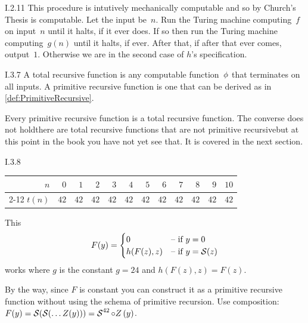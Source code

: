 %
\begin{ans}{I.2.11}
This procedure is intutively mechanically computable
and so by Church's Thesis is computable.
Let the input be~$n$.
Run the Turing machine computing~$f$ on input~$n$ until it halts,
if it ever does.
If so then run the Turing machine computing~$g(n)$ until it halts,
if ever.
After that, if after that ever comes, output~$1$.
Otherwise we are in the second case of $h$'s specification.
\end{ans}
%
%
%
%
%
%
\begin{ans}{I.3.7}
A total recursive function is any computable function~$\phi$ that terminates
on all inputs.
A primitive recursive function is one that can be derived as in
\cref{def:PrimitiveRecursive}.

Every primitive recursive function is a total recursive function.
The converse does not hold\Dash there are total recursive functions that
are not primitive recursive\Dash but at this point in the book you have
not yet see that.
It is covered in the next section.
\end{ans}
%
\begin{ans}{I.3.8}
\begin{exparts}
\item
\begin{center}
\begin{tabular}{r|*{11}{r}}
  $n$
    &$0$ &$1$ &$2$ &$3$ &$4$  &$5$  &$6$  &$7$  &$8$  &$9$  &$10$  \\
  \cline{2-12}
  $t(n)$
    &$42$ &$42$ &$42$ &$42$ &$42$ &$42$ &$42$ &$42$ &$42$ &$42$ &$42$
\end{tabular}
\end{center}
\item This
\begin{equation*}
  F(y)=
  \begin{cases}
  0  &\text{-- if $y=0$}  \\
  h(F(z),z)  &\text{-- if $y=\operatorname{\mathcal{S}}(z)$}
  \end{cases}
\end{equation*}
works where $g$ is the constant $g=24$ and
$h(F(z),z)=F(z)$.
\end{exparts}

By the way, since $F$ is constant you can construct
it as a primitive recursive function without
using the schema of primitive recursion.
Use composition:~$F(y)=\operatorname{\mathcal{S}}(\operatorname{\mathcal{S}}(\ldots Z(y)))=
  \mathord{\operatorname{\mathcal{S}}^{42}\mathbin{\circ} Z}\,(y)$.
\end{ans}
